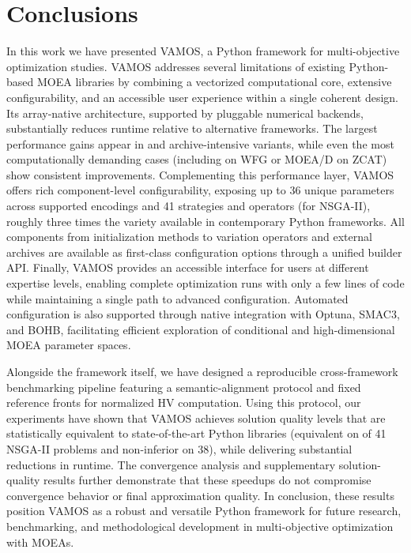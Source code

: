 \documentclass[final,5p,times,twocolumn]{elsarticle}
\newcommand{\VAMOS}{VAMOS}
\begin{document}
\section{Conclusions}
\label{sec:conclusions}

In this work we have presented \VAMOS{}, a  Python framework for multi-objective optimization studies. \VAMOS{} addresses several  limitations of existing Python-based MOEA libraries by combining a vectorized computational core, extensive configurability, and an accessible user experience within a single coherent design. Its array-native architecture, supported by pluggable numerical backends, substantially reduces runtime relative to alternative  frameworks. The largest performance gains appear in  and archive-intensive variants, while even the most computationally demanding cases (including  on WFG or MOEA/D on ZCAT) show consistent improvements. Complementing this performance layer, \VAMOS{} offers rich component-level configurability, exposing up to 36 unique parameters across supported encodings and 41 strategies and operators (for NSGA-II), roughly three times the variety available in contemporary Python frameworks. All components from initialization methods to variation operators and external archives are available as first-class configuration options through a unified builder API. Finally, \VAMOS{} provides an accessible interface for users at different expertise levels, enabling complete optimization runs with only a few lines of code while maintaining a single path to advanced configuration. Automated configuration is also supported through native integration with Optuna, SMAC3, and BOHB, facilitating efficient exploration of conditional and high-dimensional MOEA parameter spaces.

Alongside the framework itself, we have designed a reproducible cross-framework benchmarking pipeline featuring a semantic-alignment protocol and fixed reference fronts for normalized HV computation. Using this protocol, our experiments have shown that \VAMOS{} achieves solution quality levels that are statistically equivalent to state-of-the-art Python libraries (equivalent  on  of 41 NSGA-II problems and non-inferior on 38), while delivering substantial reductions in runtime. The convergence analysis and supplementary solution-quality results further demonstrate that these speedups do not compromise convergence behavior or final approximation quality. In conclusion, these results position \VAMOS{} as a robust and versatile Python framework for future research, benchmarking, and methodological development in multi-objective optimization with MOEAs.
\end{document}
